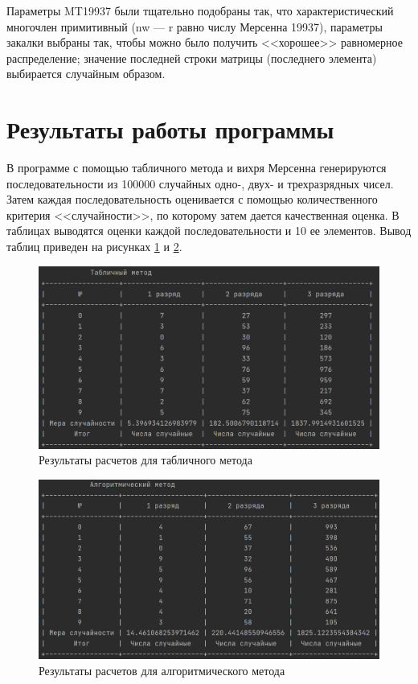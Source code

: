 \documentclass[14pt, a4paper]{extarticle}
\begin{document}
Параметры MT19937 были тщательно подобраны так, что характеристический многочлен примитивный (nw — r равно числу Мерсенна 19937), параметры закалки выбраны так, чтобы можно было получить <<хорошее>> равномерное распределение; значение последней строки матрицы (последнего элемента) выбирается случайным образом.




\section{Результаты работы программы}

В программе с помощью табличного метода и вихря Мерсенна генерируются последовательности из 100000 случайных одно-, двух- и трехразрядных чисел. Затем каждая последовательность оценивается с помощью количественного критерия <<случайности>>, по которому затем дается качественная оценка. В таблицах выводятся оценки каждой последовательности и 10 ее элементов. Вывод таблиц приведен на рисунках \ref{pic:1} и \ref{pic:2}.


\newpage
\begin{figure}[h]
	\begin{center}
		{\includegraphics[scale=0.85]{pictures/res_table.png}
			\caption{Результаты расчетов для табличного метода}
			\label{pic:1}}
	\end{center}
\end{figure}

\begin{figure}[h]
	\begin{center}
		{\includegraphics[scale=0.85]{pictures/res_alg.png}
			\caption{Результаты расчетов для алгоритмического метода}
			\label{pic:2}}
	\end{center}
\end{figure}
\end{document}
